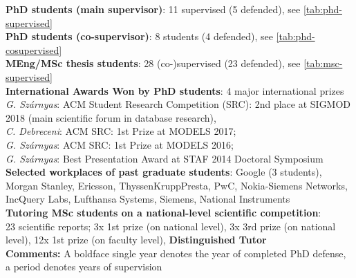 \documentclass{xetexCV}
\begin{document}

\textbf{PhD students (main supervisor)}: 11 supervised (5 defended), see \autoref{tab:phd-supervised} \\
\textbf{PhD students (co-supervisor)}: 8 students (4 defended), see \autoref{tab:phd-cosupervised} \\
\textbf{MEng/MSc thesis students}: 28 (co-)supervised (23 defended), see \autoref{tab:msc-supervised} \\

\textbf{International Awards Won by PhD students}: 4 major international prizes \\
\emph{G. Sz\'arnyas}: ACM Student Research Competition (SRC): 2nd place at SIGMOD 2018 (main scientific forum in database research), \\
\emph{C. Debreceni}: ACM SRC: 1st Prize at MODELS 2017;\\
\emph{G. Sz\'arnyas}: ACM SRC: 1st Prize at MODELS 2016; \\
\emph{G. Sz\'arnyas}: Best Presentation Award at STAF 2014 Doctoral Symposium \\


\textbf{Selected workplaces of past graduate students}: Google (3 students), Morgan Stanley, Ericsson, ThyssenKruppPresta, PwC, Nokia-Siemens Networks, 
IncQuery Labs, Lufthansa Systems, Siemens, National Instruments \\

\textbf{Tutoring MSc students on a national-level scientific competition}: \\
23 scientific reports; 3x 1st prize (on national level), 3x 3rd prize (on national
level), 12x 1st prize (on faculty level), %
\textbf{Distinguished Tutor}  \\%

\textbf{Comments:} A boldface single year denotes the year of completed PhD defense, a period denotes years of supervision \\
\end{document}
